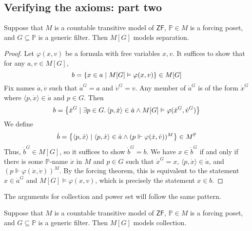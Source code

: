 \subsection{Verifying the axioms: part two}
\begin{lemma}
    Suppose that \( M \) is a countable transitive model of \( \mathsf{ZF} \), \( \mathbb P \in M \) is a forcing poset, and \( G \subseteq \mathbb P \) is a generic filter.
    Then \( M[G] \) models separation.
\end{lemma}
\begin{proof}
    Let \( \varphi(x, v) \) be a formula with free variables \( x, v \).
    It suffices to show that for any \( a, v \in M[G] \),
    \[ b = \qty{x \in a \mid M[G] \vDash \varphi(x, v)} \in M[G] \]
    Fix names \( \dot a, \dot v \) such that \( \dot a^G = a \) and \( \dot v^G = v \).
    Any member of \( \dot a^G \) is of the form \( \dot x^G \) where \( \langle p, \dot x \rangle \in \dot a \) and \( p \in G \).
    Then
    \[ b = \qty{\dot x^G \mid \exists p \in G.\, \langle p, \dot x \rangle \in \dot a \wedge M[G] \vDash \varphi(\dot x^G, \dot v^G)} \]
    We define
    \[ \dot b = \qty{\langle p, \dot x \rangle \mid \langle p, \dot x \rangle \in \dot a \wedge (p \Vdash \varphi(\dot x, \dot v))^M} \in M^{\mathbb P} \]
    Thus, \( \dot b^G \in M[G] \), so it suffices to show \( \dot b^G = b \).
    We have \( x \in \dot b^G \) if and only if there is some \( \mathbb P \)-name \( \dot x \) in \( M \) and \( p \in G \) such that \( \dot x^G = x \), \( \langle p, \dot x \rangle \in \dot a \), and \( (p \Vdash \varphi(\dot x, \dot v))^M \).
    By the forcing theorem, this is equivalent to the statement \( x \in \dot a^G \) and \( M[G] \vDash \varphi(x, v) \), which is precisely the statement \( x \in b \).
\end{proof}
The arguments for collection and power set will follow the same pattern.
\begin{lemma}
    Suppose that \( M \) is a countable transitive model of \( \mathsf{ZF} \), \( \mathbb P \in M \) is a forcing poset, and \( G \subseteq \mathbb P \) is a generic filter.
    Then \( M[G] \) models collection.
\end{lemma}
